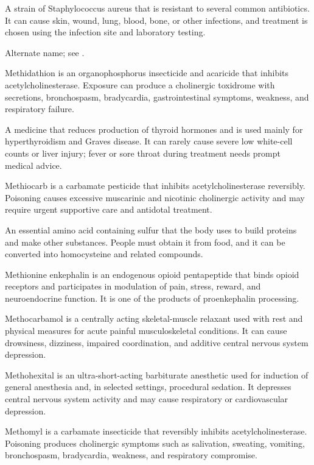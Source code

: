  A strain of Staphylococcus aureus that is resistant to several common antibiotics. It can cause skin, wound, lung, blood, bone, or other infections, and treatment is chosen using the infection site and laboratory testing.

 Alternate name; see .

 Methidathion is an organophosphorus insecticide and acaricide that inhibits acetylcholinesterase. Exposure can produce a cholinergic toxidrome with secretions, bronchospasm, bradycardia, gastrointestinal symptoms, weakness, and respiratory failure.

 A medicine that reduces production of thyroid hormones and is used mainly for hyperthyroidism and Graves disease. It can rarely cause severe low white-cell counts or liver injury; fever or sore throat during treatment needs prompt medical advice.

 Methiocarb is a carbamate pesticide that inhibits acetylcholinesterase reversibly. Poisoning causes excessive muscarinic and nicotinic cholinergic activity and may require urgent supportive care and antidotal treatment.

 An essential amino acid containing sulfur that the body uses to build proteins and make other substances. People must obtain it from food, and it can be converted into homocysteine and related compounds.

 Methionine enkephalin is an endogenous opioid pentapeptide that binds opioid receptors and participates in modulation of pain, stress, reward, and neuroendocrine function. It is one of the products of proenkephalin processing.

 Methocarbamol is a centrally acting skeletal-muscle relaxant used with rest and physical measures for acute painful musculoskeletal conditions. It can cause drowsiness, dizziness, impaired coordination, and additive central nervous system depression.

 Methohexital is an ultra-short-acting barbiturate anesthetic used for induction of general anesthesia and, in selected settings, procedural sedation. It depresses central nervous system activity and may cause respiratory or cardiovascular depression.

 Methomyl is a carbamate insecticide that reversibly inhibits acetylcholinesterase. Poisoning produces cholinergic symptoms such as salivation, sweating, vomiting, bronchospasm, bradycardia, weakness, and respiratory compromise.

